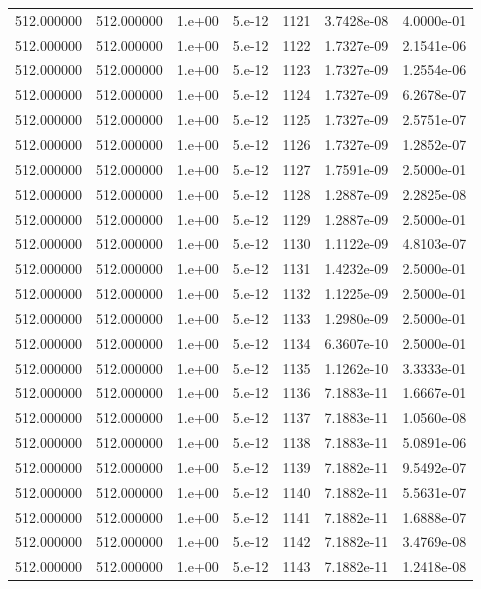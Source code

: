 \begin{table}[htbp]
\begin{tabular}{rrrrrrr}
512.000000 & 512.000000 & 1.e+00 & 5.e-12 & 1121 & 3.7428e-08 & 4.0000e-01 \\
512.000000 & 512.000000 & 1.e+00 & 5.e-12 & 1122 & 1.7327e-09 & 2.1541e-06 \\
512.000000 & 512.000000 & 1.e+00 & 5.e-12 & 1123 & 1.7327e-09 & 1.2554e-06 \\
512.000000 & 512.000000 & 1.e+00 & 5.e-12 & 1124 & 1.7327e-09 & 6.2678e-07 \\
512.000000 & 512.000000 & 1.e+00 & 5.e-12 & 1125 & 1.7327e-09 & 2.5751e-07 \\
512.000000 & 512.000000 & 1.e+00 & 5.e-12 & 1126 & 1.7327e-09 & 1.2852e-07 \\
512.000000 & 512.000000 & 1.e+00 & 5.e-12 & 1127 & 1.7591e-09 & 2.5000e-01 \\
512.000000 & 512.000000 & 1.e+00 & 5.e-12 & 1128 & 1.2887e-09 & 2.2825e-08 \\
512.000000 & 512.000000 & 1.e+00 & 5.e-12 & 1129 & 1.2887e-09 & 2.5000e-01 \\
512.000000 & 512.000000 & 1.e+00 & 5.e-12 & 1130 & 1.1122e-09 & 4.8103e-07 \\
512.000000 & 512.000000 & 1.e+00 & 5.e-12 & 1131 & 1.4232e-09 & 2.5000e-01 \\
512.000000 & 512.000000 & 1.e+00 & 5.e-12 & 1132 & 1.1225e-09 & 2.5000e-01 \\
512.000000 & 512.000000 & 1.e+00 & 5.e-12 & 1133 & 1.2980e-09 & 2.5000e-01 \\
512.000000 & 512.000000 & 1.e+00 & 5.e-12 & 1134 & 6.3607e-10 & 2.5000e-01 \\
512.000000 & 512.000000 & 1.e+00 & 5.e-12 & 1135 & 1.1262e-10 & 3.3333e-01 \\
512.000000 & 512.000000 & 1.e+00 & 5.e-12 & 1136 & 7.1883e-11 & 1.6667e-01 \\
512.000000 & 512.000000 & 1.e+00 & 5.e-12 & 1137 & 7.1883e-11 & 1.0560e-08 \\
512.000000 & 512.000000 & 1.e+00 & 5.e-12 & 1138 & 7.1883e-11 & 5.0891e-06 \\
512.000000 & 512.000000 & 1.e+00 & 5.e-12 & 1139 & 7.1882e-11 & 9.5492e-07 \\
512.000000 & 512.000000 & 1.e+00 & 5.e-12 & 1140 & 7.1882e-11 & 5.5631e-07 \\
512.000000 & 512.000000 & 1.e+00 & 5.e-12 & 1141 & 7.1882e-11 & 1.6888e-07 \\
512.000000 & 512.000000 & 1.e+00 & 5.e-12 & 1142 & 7.1882e-11 & 3.4769e-08 \\
512.000000 & 512.000000 & 1.e+00 & 5.e-12 & 1143 & 7.1882e-11 & 1.2418e-08 \\

\end{tabular}
\end{table}
